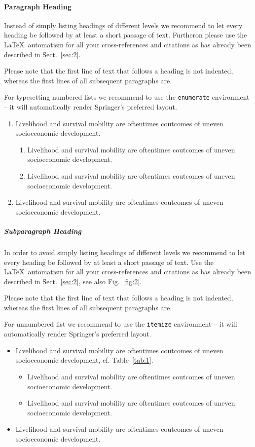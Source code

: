 \paragraph{Paragraph Heading} %
Instead of simply listing headings of different levels we recommend to let every heading be followed by at least a short passage of text. Furtheron please use the \LaTeX\ automatism for all your cross-references and citations as has already been described in Sect.~\ref{sec:2}.

Please note that the first line of text that follows a heading is not indented, whereas the first lines of all subsequent paragraphs are.

For typesetting numbered lists we recommend to use the \verb|enumerate| environment -- it will automatically render Springer's preferred layout.

\begin{enumerate}
\item{Livelihood and survival mobility are oftentimes coutcomes of uneven socioeconomic development.}
\begin{enumerate}
\item{Livelihood and survival mobility are oftentimes coutcomes of uneven socioeconomic development.}
\item{Livelihood and survival mobility are oftentimes coutcomes of uneven socioeconomic development.}
\end{enumerate}
\item{Livelihood and survival mobility are oftentimes coutcomes of uneven socioeconomic development.}
\end{enumerate}


\subparagraph{Subparagraph Heading} In order to avoid simply listing headings of different levels we recommend to let every heading be followed by at least a short passage of text. Use the \LaTeX\ automatism for all your cross-references and citations as has already been described in Sect.~\ref{sec:2}, see also Fig.~\ref{fig:2}.

Please note that the first line of text that follows a heading is not indented, whereas the first lines of all subsequent paragraphs are.

For unnumbered list we recommend to use the \verb|itemize| environment -- it will automatically render Springer's preferred layout.

\begin{itemize}
\item{Livelihood and survival mobility are oftentimes coutcomes of uneven socioeconomic development, cf. Table~\ref{tab:1}.}
\begin{itemize}
\item{Livelihood and survival mobility are oftentimes coutcomes of uneven socioeconomic development.}
\item{Livelihood and survival mobility are oftentimes coutcomes of uneven socioeconomic development.}
\end{itemize}
\item{Livelihood and survival mobility are oftentimes coutcomes of uneven socioeconomic development.}
\end{itemize}

